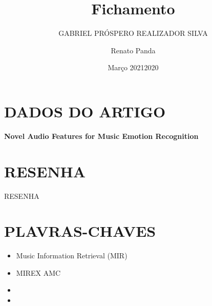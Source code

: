 \documentclass{article}
\title{Fichamento}
\author{GABRIEL PRÓSPERO REALIZADOR  SILVA}
\date{Março 2021}
\begin{document}
\maketitle

\section{DADOS DO ARTIGO}
\textbf{Novel Audio Features for Music Emotion Recognition \\}
\author{Renato Panda \\}
\date{2020}

\section{RESENHA}
RESENHA

\section{PLAVRAS-CHAVES}
\begin{itemize}
    \item Music Information Retrieval (MIR)
    \item MIREX AMC
    \item 
    \item 
\end{itemize}
\end{document}
